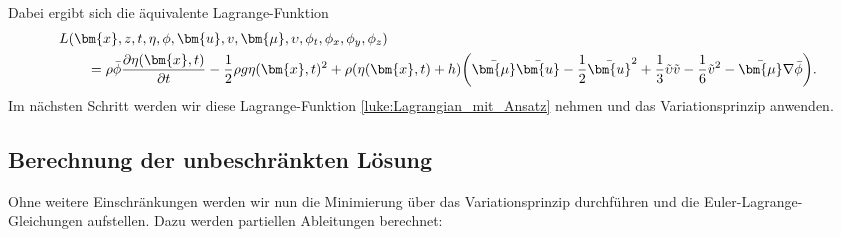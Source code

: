 Dabei ergibt sich die äquivalente Lagrange-Funktion
\begin{align}
&L(\bm{x},z,t,\eta,\phi,\bm{u}, v, \bm{\mu},\upsilon,\phi_t,\phi_x,\phi_y,\phi_z)
\notag
\\
&\qquad=
\rho\bar{\phi}\frac{\partial \eta(\bm{x}, t)}{\partial t}
-
\frac{1}{2} \rho g \eta(\bm{x}, t)^2
+
\rho(\eta(\bm{x}, t) + h)
\biggl(
\bar{\bm{\mu}}\bar{\bm{u}}
-
\frac{1}{2} \bar{\bm{u}}^2 
+
\frac{1}{3} \tilde{\upsilon}\tilde{v}
-
\frac{1}{6}\tilde{v}^2
-
\bar{\bm{\mu}}\nabla \bar{\phi}
\biggr).
\label{luke:Lagrangian_mit_Ansatz}
\end{align}
Im nächsten Schritt werden wir diese Lagrange-Funktion \eqref{luke:Lagrangian_mit_Ansatz} nehmen und das Variationsprinzip anwenden.

\subsection{Berechnung der unbeschränkten Lösung}
Ohne weitere Einschränkungen werden wir nun die Minimierung über
das Variationsprinzip durchführen und die Euler-Lagrange-Gleichungen
aufstellen.
Dazu werden partiellen Ableitungen berechnet:

